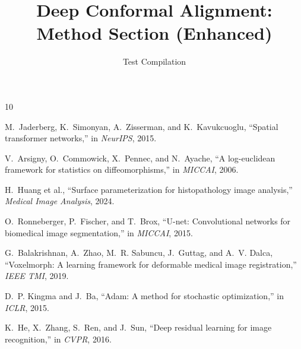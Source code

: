 \documentclass[10pt,journal,compsoc]{IEEEtran}
\begin{document}
\title{Deep Conformal Alignment: Method Section (Enhanced)}

\author{Test Compilation}

\maketitle



\begin{thebibliography}{10}

M.~Jaderberg, K.~Simonyan, A.~Zisserman, and K.~Kavukcuoglu,
``Spatial transformer networks,'' in \emph{NeurIPS}, 2015.

V.~Arsigny, O.~Commowick, X.~Pennec, and N.~Ayache,
``A log-euclidean framework for statistics on diffeomorphisms,'' in \emph{MICCAI}, 2006.

H.~Huang et al.,
``Surface parameterization for histopathology image analysis,'' \emph{Medical Image Analysis}, 2024.

O.~Ronneberger, P.~Fischer, and T.~Brox,
``U-net: Convolutional networks for biomedical image segmentation,'' in \emph{MICCAI}, 2015.

G.~Balakrishnan, A.~Zhao, M.~R. Sabuncu, J.~Guttag, and A.~V. Dalca,
``Voxelmorph: A learning framework for deformable medical image registration,'' \emph{IEEE TMI}, 2019.

D.~P. Kingma and J.~Ba,
``Adam: A method for stochastic optimization,'' in \emph{ICLR}, 2015.

K.~He, X.~Zhang, S.~Ren, and J.~Sun,
``Deep residual learning for image recognition,'' in \emph{CVPR}, 2016.

\end{thebibliography}
\end{document}
